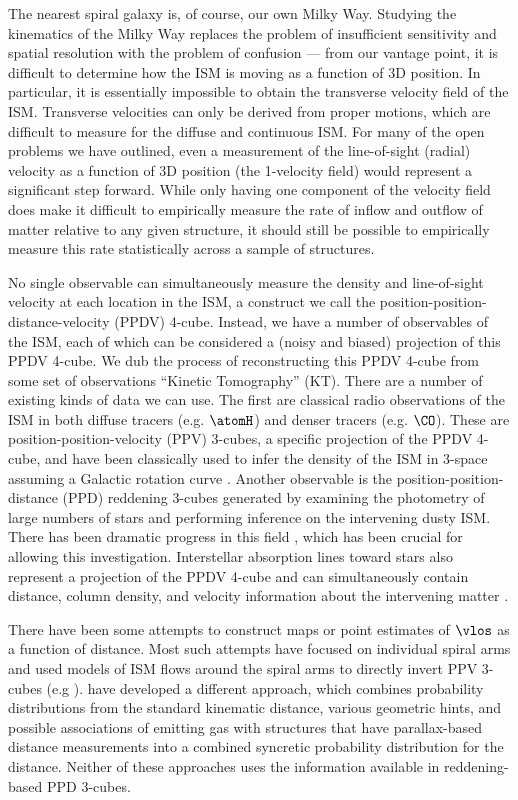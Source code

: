 The nearest spiral galaxy is, of course, our own Milky Way. 
Studying the kinematics of the Milky Way replaces the problem of insufficient sensitivity and spatial resolution with the problem of confusion --- from our vantage point, it is difficult to determine how the ISM is moving as a function of 3D position.
In particular, it is essentially impossible to obtain the transverse velocity field of the ISM. Transverse velocities can only be derived from proper motions, which are difficult to measure for the diffuse and continuous ISM.
For many of the open problems we have outlined, even a measurement of the line-of-sight (radial) velocity as a function of 3D position (the 1-velocity field) would represent a significant step forward. 
While only having one component of the velocity field does make it difficult to empirically measure the  rate of inflow and outflow of matter relative to any given structure, it should still be possible to empirically measure this rate statistically across a sample of structures. 

No single observable can simultaneously measure the density and line-of-sight velocity at each location in the ISM, a construct we call the position-position-distance-velocity (PPDV) 4-cube. 
Instead, we have a number of observables of the ISM, each of which can be considered a (noisy and biased) projection of this PPDV 4-cube.
We dub the process of reconstructing this PPDV 4-cube from some set of observations ``Kinetic Tomography'' (KT). There are a number of existing kinds of data we can use. The first are classical radio observations of the ISM in both diffuse tracers (e.g. $\atomH$) and denser tracers (e.g. $\CO$). These are position-position-velocity (PPV) 3-cubes, a specific projection of the PPDV 4-cube, and have been classically used to infer the density of the ISM in 3-space assuming a Galactic rotation curve \citep[e.g.][ and references therein]{Levine_2006}. Another observable is the position-position-distance (PPD) reddening 3-cubes generated by examining the photometry of large numbers of stars and performing inference on the intervening dusty ISM. There has been dramatic progress in this field \citep{Marshall_2006,Lallement_2014,Green_2015}, which has been crucial for allowing this investigation. 
Interstellar absorption lines toward stars also represent a projection of the PPDV 4-cube and can simultaneously contain distance, column density, and velocity information about the intervening matter \citep{Welsh10,Zasowski_2014,2015MmSAI..86..521Z}.

There have been some attempts to construct maps or point estimates of $\vlos$ as a function of distance. 
Most such attempts have focused on individual spiral arms and used models of ISM flows around the spiral arms to directly invert PPV 3-cubes (e.g  \citealt{1972A&A....16..118S,Foster_2006}).
\citet{Reid_2016} have developed a different approach, which combines probability distributions from the standard kinematic distance, various geometric hints, and possible associations of emitting gas with structures that have parallax-based distance measurements into a combined syncretic probability distribution for the distance. 
Neither of these approaches uses the information available in reddening-based PPD 3-cubes. 

